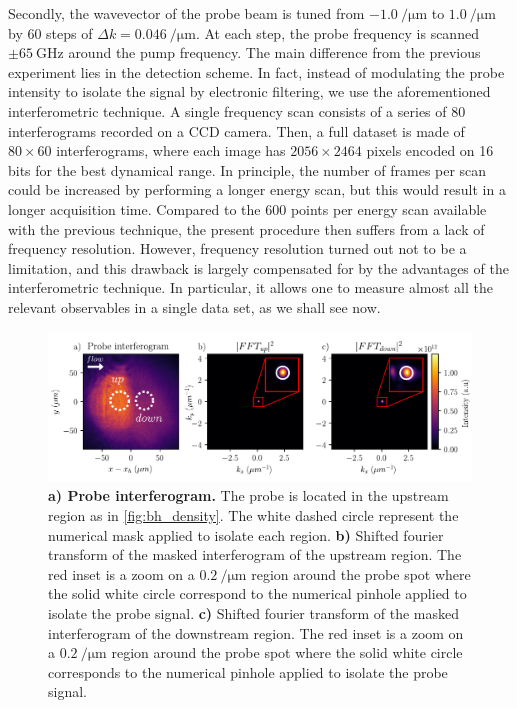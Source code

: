Secondly, the wavevector of the probe beam is tuned from $\SI{-1.0}{\per \micro \meter}$ to $\SI{1.0}{\per \micro \meter}$ by 60 steps of $\Delta k =\SI{0.046}{\per \micro \meter}$.
At each step, the probe frequency is scanned $\pm \SI{65}{\giga \hertz}$ around the pump frequency. The main difference from the previous experiment lies in the detection scheme. In fact, instead of modulating the probe intensity to isolate the signal by electronic filtering, we use the aforementioned interferometric technique. A single frequency scan consists of a series of 80 interferograms recorded on a CCD camera. Then, a full dataset is made of $80\times 60$ interferograms, where each image has $2056\times 2464$ pixels encoded on 16 bits
for the best dynamical range. In principle, the number of frames per scan could be increased by performing a longer energy scan, but this would result in a longer acquisition time. Compared to the $600$ points per energy scan available with the previous technique,
the present procedure then suffers from a lack of frequency resolution. However, frequency resolution turned out not to be a limitation, and this drawback
is largely compensated for by the advantages of the interferometric technique. In particular, it allows one to measure almost all the relevant observables in a single data set, as we shall see now. 

\begin{figure}
    \centering
    \includegraphics[width=1\textwidth]{chap_stimulated_hawking/fig/fft_bh_fluctu.pdf}
    \caption{\textbf{a) Probe interferogram.} The probe is located in the upstream region as in \autoref{fig:bh_density}. The white dashed circle represent the numerical mask applied to isolate each region.
    \textbf{b)} Shifted fourier transform of the masked interferogram of the upstream region. The red inset is a zoom on a $\SI{0.2}{\per \micro \meter}$ region around the probe spot where the solid white circle correspond to the numerical pinhole applied to isolate the probe signal.
    \textbf{c)} Shifted fourier transform of the masked interferogram of the downstream region. The red inset is a zoom on a $\SI{0.2}{\per \micro \meter}$ region around the probe spot where the solid white circle corresponds to the numerical pinhole applied to isolate the probe signal.}
    \label{fig:fft_bh_fluctu}
\end{figure}

